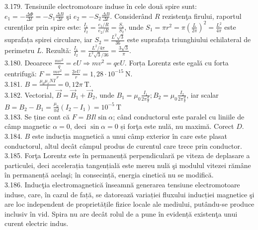 3.179. Tensiunile electromotoare induse în cele două spire sunt: $e_{1}=-\frac{\Delta \Phi}{\Delta t}=-S_{1} \frac{\Delta B}{\Delta t}$ şi $e_{2}=-S_{2} \frac{\Delta B}{\Delta t}$. Considerând $R$ rezistenţa firului, raportul curenților prin spire este: $\frac{I_{1}}{I_{2}}=\frac{e_{1} / R}{e_{2} / R}=\frac{S_{1}}{S_{2}}$, unde $S_{1}=\pi r^{2}=\pi\left(\frac{L}{2 \pi}\right)^{2}=\frac{L^{2}}{4 \pi}$ este suprafața spirei circulare, iar $S_{2}=\frac{L^{2} \sqrt{3}}{36}$ este suprafața triunghiului echilateral de perimetru $L$. Rezultǎ: $\frac{I_{1}}{I_{2}}=\frac{L^{2} / 4 \pi}{L^{2} \sqrt{3} / 36}=\frac{3 \sqrt{3}}{\pi}$.\\

3.180. Deoarece $\frac{m v^{2}}{q}=e U \Rightarrow m v^{2}=q e U$. Forța Lorentz este egală cu forta centrifugă: $F=\frac{m v^{2}}{r}=\frac{2 e U}{r}=1,28 \cdot 10^{-15} \mathrm{~N}$.\\

3.181. $B=\frac{\mu_{0} \mu_{r} N I}{l}=0,12 \pi \mathrm{~T}$.\\

3.182. Vectorial, $\vec{B}=\vec{B}_{1}+\vec{B}_{2}$, unde $B_{1}=\mu_{0} \frac{I_{1}}{2 \pi \frac{d}{2}} ; B_{2}=\mu_{0} \frac{I_{2}}{2 \pi \frac{d}{2}}$, iar scalar\\$B=B_{2}-B_{1}=\frac{\mu_{0}}{\pi d}\left(I_{2}-I_{1}\right)=10^{-5} \mathrm{~T}$\\

3.183. Se ține cont că $F=B I l \sin \alpha$; când conductorul este paralel cu liniile de câmp magnetic $\alpha=0$, deci $\sin \alpha=0$ și forţa este nulă, nu maximă. Corect $D$.\\

3.184. $B$ este inducția magnetică a unui câmp exterior în care este plasat conductorul, altul decât câmpul produs de curentul care trece prin conductor.\\

3.185. Forţa Lorentz este în permanență perpendiculară pe viteza de deplasare a particulei, deci accelerația tangențială este mereu nulă şi modulul vitezei rămâne în permanență acelaşi; în consecință, energia cinetică nu se modifică.\\

3.186. Inducţia electromagnetică înseamnă generarea tensiune electromotoare induse, care, în cazul de față, se datorează variației fluxului inducției magnetice şi are loc independent de proprietățile fizice locale ale mediului, putându-se produce inclusiv în vid. Spira nu are decât rolul de a pune în evidență existenţa unui curent electric indus.\\


